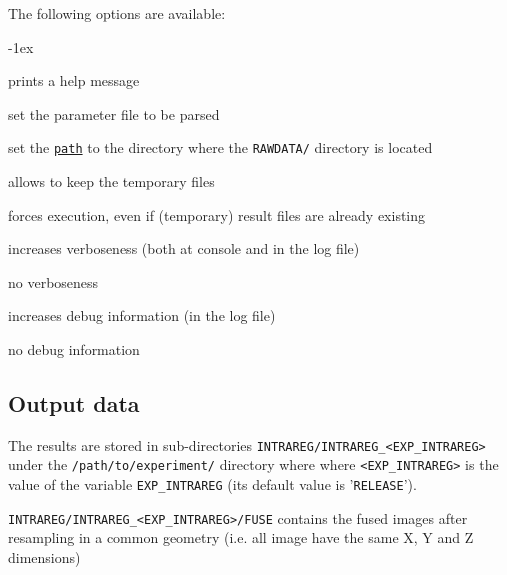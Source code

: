 The following options are available:
\begin{description}
  \itemsep -1ex
\item[\texttt{-h}] prints a help message
\item[\texttt{-p \underline{file}}] set the parameter file to be parsed
\item[\texttt{-e \underline{path}}] set the
  \texttt{\underline{path}} to the directory where the
  \texttt{RAWDATA/} directory is located
\item[\texttt{-k}] allows to keep the temporary files
\item[\texttt{-f}] forces execution, even if (temporary) result files
  are already existing
\item[\texttt{-v}] increases verboseness (both at console and in the
  log file)
\item[\texttt{-nv}] no verboseness
\item[\texttt{-d}]  increases debug information (in the
  log file)
\item[\texttt{-nd}] no debug information
\end{description}


\subsection{Output data}

The results are stored in sub-directories
\texttt{INTRAREG/INTRAREG\_<EXP\_INTRAREG>} under the
\texttt{/path/to/experiment/} directory where where \texttt{<EXP\_INTRAREG>} is the value of the variable \texttt{EXP\_INTRAREG} (its
default value is '\texttt{RELEASE}'). 



\texttt{INTRAREG/INTRAREG\_<EXP\_INTRAREG>/FUSE} contains the fused
images after resampling in a common geometry (i.e. all image have the
same X, Y and Z dimensions)




